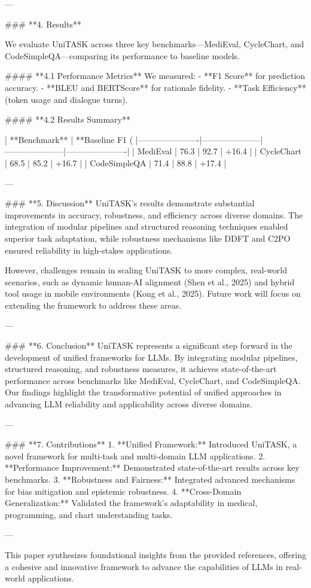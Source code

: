 ---

### **4. Results**

We evaluate UniTASK across three key benchmarks—MediEval, CycleChart, and CodeSimpleQA—comparing its performance to baseline models.

#### **4.1 Performance Metrics**
We measured:
- **F1 Score** for prediction accuracy.
- **BLEU and BERTScore** for rationale fidelity.
- **Task Efficiency** (token usage and dialogue turns).

#### **4.2 Results Summary**

| **Benchmark**       | **Baseline F1 (%
|----------------------|---------------------|---------------------|----------------------|
| MediEval             | 76.3               | 92.7               | +16.4               |
| CycleChart           | 68.5               | 85.2               | +16.7               |
| CodeSimpleQA         | 71.4               | 88.8               | +17.4               |

---

### **5. Discussion**
UniTASK's results demonstrate substantial improvements in accuracy, robustness, and efficiency across diverse domains. The integration of modular pipelines and structured reasoning techniques enabled superior task adaptation, while robustness mechanisms like DDFT and C2PO ensured reliability in high-stakes applications.

However, challenges remain in scaling UniTASK to more complex, real-world scenarios, such as dynamic human-AI alignment (Shen et al., 2025) and hybrid tool usage in mobile environments (Kong et al., 2025). Future work will focus on extending the framework to address these areas.

---

### **6. Conclusion**
UniTASK represents a significant step forward in the development of unified frameworks for LLMs. By integrating modular pipelines, structured reasoning, and robustness measures, it achieves state-of-the-art performance across benchmarks like MediEval, CycleChart, and CodeSimpleQA. Our findings highlight the transformative potential of unified approaches in advancing LLM reliability and applicability across diverse domains.

---

### **7. Contributions**
1. **Unified Framework:** Introduced UniTASK, a novel framework for multi-task and multi-domain LLM applications.
2. **Performance Improvement:** Demonstrated state-of-the-art results across key benchmarks.
3. **Robustness and Fairness:** Integrated advanced mechanisms for bias mitigation and epistemic robustness.
4. **Cross-Domain Generalization:** Validated the framework's adaptability in medical, programming, and chart understanding tasks.

---

This paper synthesizes foundational insights from the provided references, offering a cohesive and innovative framework to advance the capabilities of LLMs in real-world applications.